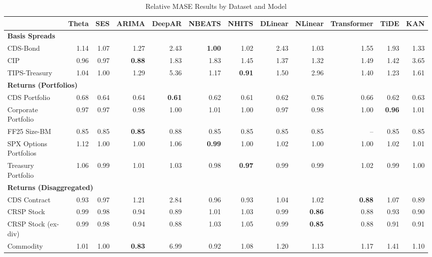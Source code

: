 
\begin{table}[htbp]
\centering
\caption{Relative MASE Results by Dataset and Model}
\label{tab:relative_mase_results}
\scriptsize
\setlength{\tabcolsep}{1.5pt}
\renewcommand{\arraystretch}{0.9}
\begin{tabular}{@{}lrrrrrrrrrrr@{}}
\toprule
 & Theta & SES & ARIMA & DeepAR & NBEATS & NHITS & DLinear & NLinear & Transformer & TiDE & KAN \\
\midrule
\multicolumn{12}{l}{\textbf{Basis Spreads}} \\
CDS-Bond & 1.14 & 1.07 & 1.27 & 2.43 & \textbf{1.00} & 1.02 & 2.43 & 1.03 & 1.55 & 1.93 & 1.33 \\
CIP & 0.96 & 0.97 & \textbf{0.88} & 1.83 & 1.83 & 1.45 & 1.37 & 1.32 & 1.49 & 1.42 & 3.65 \\
TIPS-Treasury & 1.04 & 1.00 & 1.29 & 5.36 & 1.17 & \textbf{0.91} & 1.50 & 2.96 & 1.40 & 1.23 & 1.61 \\
\midrule
\multicolumn{12}{l}{\textbf{Returns (Portfolios)}} \\
CDS Portfolio & 0.68 & 0.64 & 0.64 & \textbf{0.61} & 0.62 & 0.61 & 0.62 & 0.76 & 0.66 & 0.62 & 0.63 \\
Corporate Portfolio & 0.97 & 0.97 & 0.98 & 1.00 & 1.01 & 1.00 & 0.97 & 0.98 & 1.00 & \textbf{0.96} & 1.01 \\
FF25 Size-BM & 0.85 & 0.85 & \textbf{0.85} & 0.88 & 0.85 & 0.85 & 0.85 & 0.85 & -- & 0.85 & 0.85 \\
SPX Options Portfolios & 1.12 & 1.00 & 1.00 & 1.06 & \textbf{0.99} & 1.00 & 1.02 & 1.00 & 1.00 & 1.02 & 1.01 \\
Treasury Portfolio & 1.06 & 0.99 & 1.01 & 1.03 & 0.98 & \textbf{0.97} & 0.99 & 0.99 & 1.02 & 0.99 & 1.00 \\
\midrule
\multicolumn{12}{l}{\textbf{Returns (Disaggregated)}} \\
CDS Contract & 0.93 & 0.97 & 1.21 & 2.84 & 0.96 & 0.93 & 1.04 & 1.02 & \textbf{0.88} & 1.07 & 0.89 \\
CRSP Stock & 0.99 & 0.98 & 0.94 & 0.89 & 1.01 & 1.03 & 0.99 & \textbf{0.86} & 0.88 & 0.93 & 0.90 \\
CRSP Stock (ex-div) & 0.99 & 0.98 & 0.94 & 0.88 & 1.03 & 1.05 & 0.99 & \textbf{0.85} & 0.88 & 0.91 & 0.91 \\
Commodity & 1.01 & 1.00 & \textbf{0.83} & 6.99 & 0.92 & 1.08 & 1.20 & 1.13 & 1.17 & 1.41 & 1.10 \\

\end{tabular}
\end{table}
